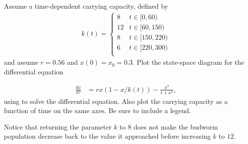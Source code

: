 \begin{problem}
Assume a time-dependent carrying capacity, defined by 
\begin{align*}	
k(t) = \begin{cases}
  8  & t \in [0,60) \\
  12  & t \in [60,150) \\
  8 & t \in [150,220) \\
  6 & t \in [220,300) \\
\end{cases}
\end{align*}
 and assume $r=0.56$ and $x(0)=x_0=0.3$. Plot the state-space diagram for the differential equation

\begin{align*}
	\frac{dx}{d \tau} &= rx(1-x/k(t)) - \frac{x^2}{1+x^2},
\end{align*}
using  to solve the differential equation. Also plot the carrying capacity as a function of time on the same axes.
Be sure to include a legend.

Notice that returning the parameter $k$ to $8$ does not make the budworm population decrease back to the value it approached before increasing $k$ to $12$.

\end{problem} 
